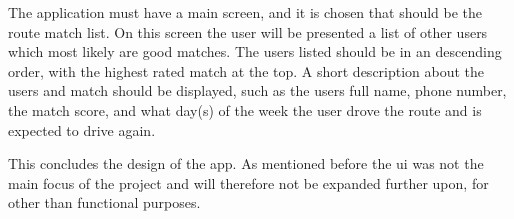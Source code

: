 The application must have a main screen, and it is chosen that should be the route match list. 
On this screen the user will be presented a list of other users which most likely are good matches. 
The users listed should be in an descending order, with the highest rated match at the top.
A short description about the users and match should be displayed, such as the users full name, phone number, the match score, and what day(s) of the week the user drove the route and is expected to drive again.

This concludes the design of the app.
As mentioned before the \gls{ui} was not the main focus of the project and will therefore not be expanded further upon, for other than functional purposes.


